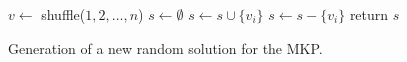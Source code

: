 \begin{figure}
\begin{algorithmic}[1]
    \State $v \leftarrow $ shuffle($1, 2, \ldots, n$)
	\State $s \leftarrow \emptyset$ 
	  \State $s \leftarrow s \cup \{v_i\}$ 
	   
	    \State $s \leftarrow s - \{v_i\}$
      \EndIf
	\EndFor
  \State return $s$
  \EndProcedure
\end{algorithmic}
\caption{Generation of a new random solution for the MKP.}
\label{alg:new}
\end{figure}


\begin{figure}[!tbp]
  \centering
  \begin{minipage}[b]{0.4\textwidth}

\end{minipage}
\end{figure}
